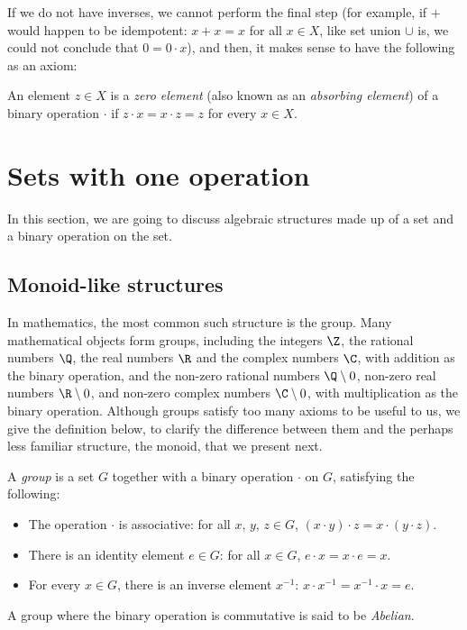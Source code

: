 If we do not have inverses, we cannot perform the final step (for example, if $+$ would happen to be idempotent: $x + x = x$ for all $x \in X$, like set union $\cup$ is, we could not conclude that $0 = 0 \cdot x$), and then, it makes sense to have the following as an axiom:
\begin{Definition}
  An element $z \in X$ is a \emph{zero element} (also known as an \emph{absorbing element}) of a binary operation $\cdot$ if $z \cdot x = x \cdot z = z$ for every $x \in X$.
\end{Definition}

\section{Sets with one operation} %
\label{Set-with-one-op}
In this section, we are going to discuss algebraic structures made up of a set and a binary operation on the set.
\subsection{Monoid-like structures}
In mathematics, the most common such structure is the group. Many mathematical objects form groups, including the integers $\Z$, the rational numbers $\Q$, the real numbers $\R$ and the complex numbers $\C$, with addition as the binary operation, and the non-zero rational numbers $\Q\setminus{0}$, non-zero real numbers $\R\setminus{0}$, and non-zero complex numbers $\C\setminus{0}$, with multiplication as the binary operation. Although groups satisfy too many axioms to be useful to us, we give the definition below, to clarify the difference between them and the perhaps less familiar structure, the monoid, that we present next.
\begin{Definition}
A \emph{group} is a set $G$ together with a binary operation $\cdot$ on $G$, satisfying the following:
\begin{itemize}
\item The operation $\cdot$ is associative: for all $x$, $y$, $z \in G$, $(x \cdot y) \cdot z = x \cdot (y \cdot z)$. 
\item There is an identity element $e \in G$: for all $x \in G$, $e \cdot x = x \cdot e = x$.
\item For every $x \in G$, there is an inverse element $x^{-1}$: $x \cdot x^{-1} = x^{-1} \cdot x = e$.
\end{itemize}
A group where the binary operation is commutative is said to be \emph{Abelian}.
\end{Definition}


